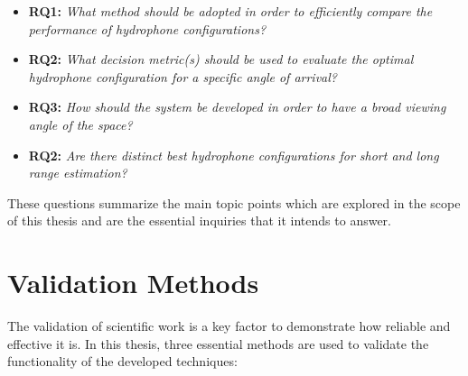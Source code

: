 \begin{itemize}

	\item \textbf{RQ1: }\textit{What method should be adopted in order to efficiently compare the performance of hydrophone configurations?}
	
	\item \textbf{RQ2: }\textit{What decision metric(s) should be used to evaluate the optimal hydrophone configuration for a specific angle of arrival?}
	
	\item \textbf{RQ3: }\textit{How should the system be developed in order to have a broad viewing angle of the space?}
	
	\item \textbf{RQ2: }\textit{Are there distinct best hydrophone configurations for short and long range estimation?}
	
\end{itemize}

These questions summarize the main topic points which are explored in the scope of this thesis and are the essential inquiries that it intends to answer.


\section{Validation Methods} \label{sec:validation}

The validation of scientific work is a key factor to demonstrate how reliable and effective it is. In this thesis, three essential methods are used to validate the functionality of the developed techniques:

